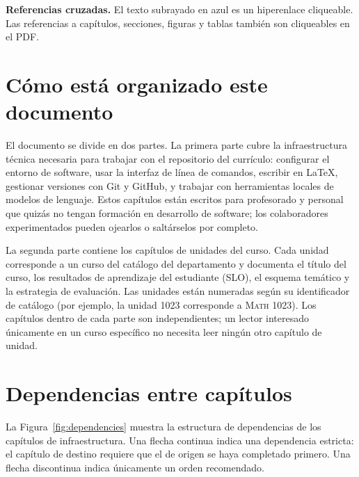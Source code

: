 \noindent
\textbf{Referencias cruzadas.} El texto subrayado en azul es un hiperenlace
cliqueable. Las referencias a capítulos, secciones, figuras y tablas también
son cliqueables en el PDF.

\section*{Cómo está organizado este documento}

El documento se divide en dos partes. La primera parte cubre la
infraestructura técnica necesaria para trabajar con el repositorio del
currículo: configurar el entorno de software, usar la
interfaz de línea de comandos, escribir en \LaTeX{}, gestionar versiones con
Git y GitHub, y trabajar con herramientas locales de modelos de lenguaje. Estos
capítulos están escritos para profesorado y personal que quizás no tengan
formación en desarrollo de software; los colaboradores experimentados pueden ojearlos
o saltárselos por completo.

La segunda parte contiene los capítulos de unidades del curso. Cada unidad
corresponde a un curso del catálogo del departamento y documenta el
título del curso, los resultados de aprendizaje del estudiante (SLO), el esquema temático y
la estrategia de evaluación. Las unidades están numeradas según su identificador de catálogo
(por ejemplo, la unidad 1023 corresponde a \textsc{Math 1023}). Los
capítulos dentro de cada parte son independientes; un lector interesado únicamente
en un curso específico no necesita leer ningún otro capítulo de unidad.

\section*{Dependencias entre capítulos}

      \renewcommand{\thefigure}{\arabic{figure}}
      \setcounter{figure}{0}
      La Figura~\ref{fig:dependencies} muestra la estructura de dependencias de los
      capítulos de infraestructura. Una flecha continua indica una dependencia estricta:
      el capítulo de destino requiere que el de origen se haya completado primero. Una
      flecha discontinua indica únicamente un orden recomendado.

